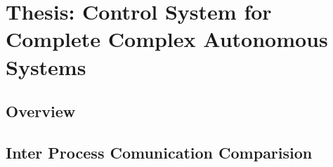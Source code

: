\chapter{Thesis: Control System for Complete Complex Autonomous Systems}\label{sec:hubo-ach}

\section{Overview}




\section{Inter Process Comunication Comparision}
	
